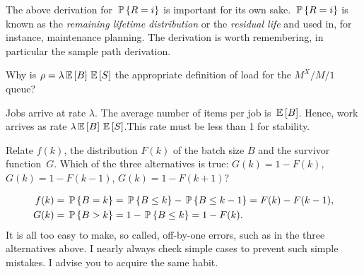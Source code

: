 \begin{remark}
  The above derivation for $\P{R=i}$ is important for its own
  sake. $\P{R=i}$ is known as the \emph{remaining lifetime
      distribution} or the \emph{residual life} and used in, for
    instance, maintenance planning. The derivation is worth
    remembering, in particular the sample path derivation.
\end{remark}

\begin{question}
  Why is $\rho = \lambda \E B \E S$ the appropriate definition
  of load for the $M^X/M/1$ queue?
  \begin{solution}
    Jobs arrive at rate $\lambda$. The average number of items per job
    is $\E B$. Hence, work arrives as rate $\lambda \E B \E S$.This
    rate must be less than 1 for stability.
  \end{solution}
\end{question}

\begin{question}
  Relate $f(k)$, the distribution $F(k)$ of the batch size $B$ and the
  survivor function~$G$. Which of the three alternatives is true:
  $G(k) = 1-F(k)$, $G(k) = 1-F(k-1)$, $G(k) = 1-F(k+1)$?
  \begin{solution}
    \begin{align*}
    f(k) &= \P{B=k} = \P{B\leq k} - \P{B\leq k-1} = F(k)-F(k-1), \\
    G(k) &= \P{B>k} = 1 - \P{B\leq k} = 1-F(k).        
    \end{align*}
    It is all too easy to make, so called, off-by-one errors, such as
    in the three alternatives above.  I nearly always check simple
    cases to prevent such simple mistakes. I advise you to acquire the
    same habit.
  \end{solution}
\end{question}

